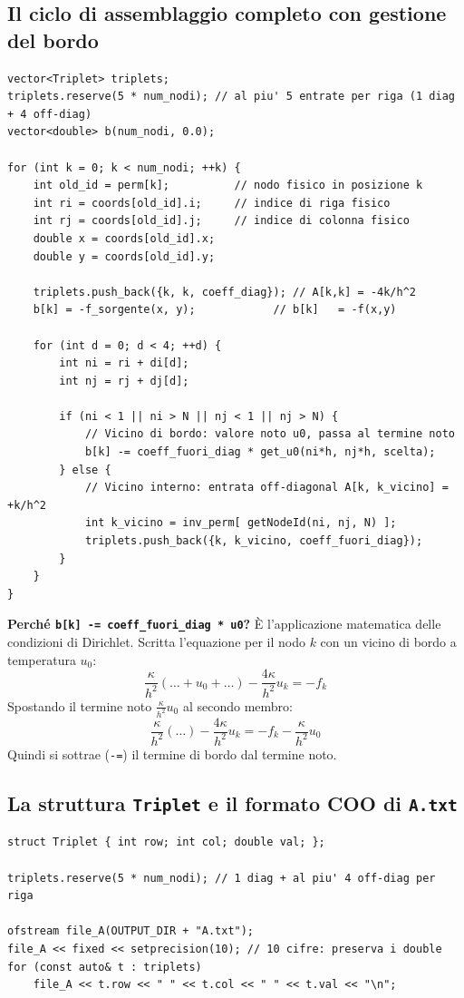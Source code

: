 \documentclass[a4paper,11pt]{article}
\theoremstyle{definition}
\begin{document}
\subsection{Il ciclo di assemblaggio completo con gestione del bordo}

\begin{lstlisting}[style=cpp, caption={Ciclo principale: dalla riga k della matrice riordinata alle entrate}]
vector<Triplet> triplets;
triplets.reserve(5 * num_nodi); // al piu' 5 entrate per riga (1 diag + 4 off-diag)
vector<double> b(num_nodi, 0.0);

for (int k = 0; k < num_nodi; ++k) {
    int old_id = perm[k];          // nodo fisico in posizione k
    int ri = coords[old_id].i;     // indice di riga fisico
    int rj = coords[old_id].j;     // indice di colonna fisico
    double x = coords[old_id].x;
    double y = coords[old_id].y;

    triplets.push_back({k, k, coeff_diag}); // A[k,k] = -4k/h^2
    b[k] = -f_sorgente(x, y);            // b[k]   = -f(x,y)

    for (int d = 0; d < 4; ++d) {
        int ni = ri + di[d];
        int nj = rj + dj[d];

        if (ni < 1 || ni > N || nj < 1 || nj > N) {
            // Vicino di bordo: valore noto u0, passa al termine noto
            b[k] -= coeff_fuori_diag * get_u0(ni*h, nj*h, scelta);
        } else {
            // Vicino interno: entrata off-diagonal A[k, k_vicino] = +k/h^2
            int k_vicino = inv_perm[ getNodeId(ni, nj, N) ];
            triplets.push_back({k, k_vicino, coeff_fuori_diag});
        }
    }
}
\end{lstlisting}

\textbf{Perché \texttt{b[k] -= coeff\_fuori\_diag * u0}?} È l'applicazione matematica delle condizioni di Dirichlet. Scritta l'equazione per il nodo $k$ con un vicino di bordo a temperatura $u_0$:
\[
  \frac{\kappa}{h^2}(\ldots + u_0 + \ldots) - \frac{4\kappa}{h^2}u_k = -f_k
\]
Spostando il termine noto $\frac{\kappa}{h^2}u_0$ al secondo membro:
\[
  \frac{\kappa}{h^2}(\ldots) - \frac{4\kappa}{h^2}u_k = -f_k - \frac{\kappa}{h^2}u_0
\]
Quindi si sottrae (\texttt{-=}) il termine di bordo dal termine noto.

\subsection{La struttura \texttt{Triplet} e il formato COO di \texttt{A.txt}}

\begin{lstlisting}[style=cpp, caption={Struttura Triplet e scrittura A.txt con alta precisione}]
struct Triplet { int row; int col; double val; };

triplets.reserve(5 * num_nodi); // 1 diag + al piu' 4 off-diag per riga

ofstream file_A(OUTPUT_DIR + "A.txt");
file_A << fixed << setprecision(10); // 10 cifre: preserva i double
for (const auto& t : triplets)
    file_A << t.row << " " << t.col << " " << t.val << "\n";
\end{lstlisting}
\end{document}
